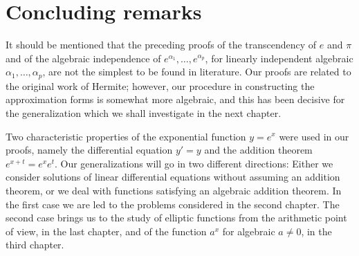 \section{Concluding remarks}

It should be mentioned that the preceding proofs of the transcendency of $e$ and $\pi$ and of the algebraic independence of $e^{\alpha_1}, \dots, e^{\alpha_p}$, for linearly independent algebraic $\alpha_1, \dots, \alpha_p$, are not the simplest to be found in literature. Our proofs are related to the original work of Hermite; however, our procedure in constructing the approximation forms is somewhat more algebraic, and this has been decisive for the generalization which we shall investigate in the next chapter.

Two characteristic properties of the exponential function $y = e^x$ were used in our proofs, namely the differential equation $y' = y$ and the addition theorem $e^{x+t} = e^x e^t$. Our generalizations will go in two different directions: Either we consider solutions of linear differential equations without assuming an addition theorem, or we deal with functions satisfying an algebraic addition theorem. In the first case we are led to the problems considered in the second chapter. The second case brings us to the study of elliptic functions from the arithmetic point of view, in the last chapter, and of the function $a^x$ for algebraic $a \neq 0$, in the third chapter.
